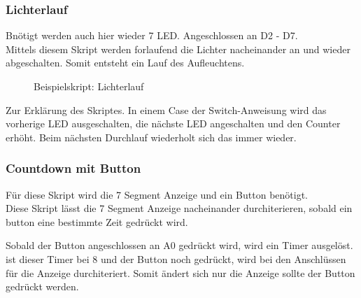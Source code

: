 \subsubsection{Lichterlauf}
Bnötigt werden auch hier wieder 7 LED. Angeschlossen an D2 - D7.\\
Mittels diesem Skript werden forlaufend die Lichter nacheinander an und wieder
abgeschalten. Somit entsteht ein Lauf des Aufleuchtens.\newline

\begin{figure}[H]

\caption{Beispielskript: Lichterlauf}
\label{output}
\end{figure}
Zur Erklärung des Skriptes. In einem Case der Switch-Anweisung wird das
vorherige LED ausgeschalten, die nächste LED angeschalten und den Counter
erhöht. Beim nächsten Durchlauf wiederholt sich das immer wieder.

\subsubsection{Countdown mit Button}
Für diese Skript wird die 7 Segment Anzeige und ein Button benötigt.\\
Diese Skript lässt die 7 Segment Anzeige nacheinander durchiterieren, sobald
ein button eine bestimmte Zeit gedrückt wird.



Sobald der Button angeschlossen an A0 gedrückt wird, wird ein Timer ausgelöst.
ist dieser Timer bei 8 und der Button noch gedrückt, wird bei den Anschlüssen
für die Anzeige durchiteriert. Somit ändert sich nur die Anzeige sollte der
Button gedrückt werden. 
